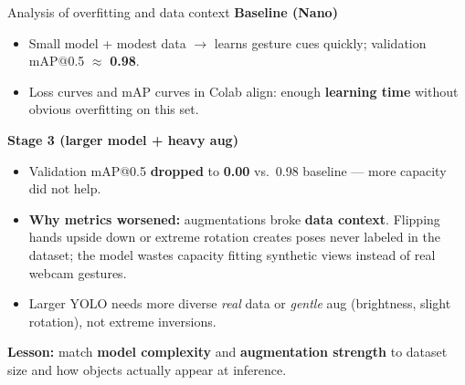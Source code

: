 \documentclass[aspectratio=169]{beamer}
\makeatletter
\newcommand{\StageThreeMap}{0.00}        %
\makeatother
\begin{document}
\begin{frame}{Analysis of overfitting and data context}
  \textbf{Baseline (Nano)}
  \begin{itemize}
    \item Small model + modest data $\rightarrow$ learns gesture cues quickly; validation mAP@0.5 $\approx$ \textbf{0.98}.
    \item Loss curves and mAP curves in Colab align: enough \textbf{learning time} without obvious overfitting on this set.
  \end{itemize}
  \textbf{Stage 3 (larger model + heavy aug)}
  \begin{itemize}
    \item Validation mAP@0.5 \textbf{dropped} to \textbf{\StageThreeMap} vs.\ 0.98 baseline --- more capacity did not help.
    \item \textbf{Why metrics worsened:} augmentations broke \textbf{data context}. Flipping hands upside down or extreme rotation creates poses never labeled in the dataset; the model wastes capacity fitting synthetic views instead of real webcam gestures.
    \item Larger YOLO needs more diverse \emph{real} data or \emph{gentle} aug (brightness, slight rotation), not extreme inversions.
  \end{itemize}
  \textbf{Lesson:} match \textbf{model complexity} and \textbf{augmentation strength} to dataset size and how objects actually appear at inference.
\end{frame}
\end{document}
